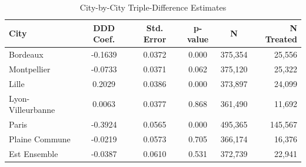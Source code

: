 \begin{table}[!h]
\centering
\caption{\label{tab:tab:city_estimates}City-by-City Triple-Difference Estimates}
\centering
\begin{tabular}[t]{lccccr}
\toprule
City & DDD Coef. & Std. Error & p-value & N & N Treated\\
\midrule
Bordeaux & -0.1639 & 0.0372 & 0.000 & 375,354 & 25,556\\
Montpellier & -0.0733 & 0.0371 & 0.062 & 375,120 & 25,322\\
Lille & 0.2029 & 0.0386 & 0.000 & 373,897 & 24,099\\
Lyon-Villeurbanne & 0.0063 & 0.0377 & 0.868 & 361,490 & 11,692\\
Paris & -0.3924 & 0.0565 & 0.000 & 495,365 & 145,567\\
\addlinespace
Plaine Commune & -0.0219 & 0.0573 & 0.705 & 366,174 & 16,376\\
Est Ensemble & -0.0387 & 0.0610 & 0.531 & 372,739 & 22,941\\
\bottomrule
\end{tabular}
\end{table}
